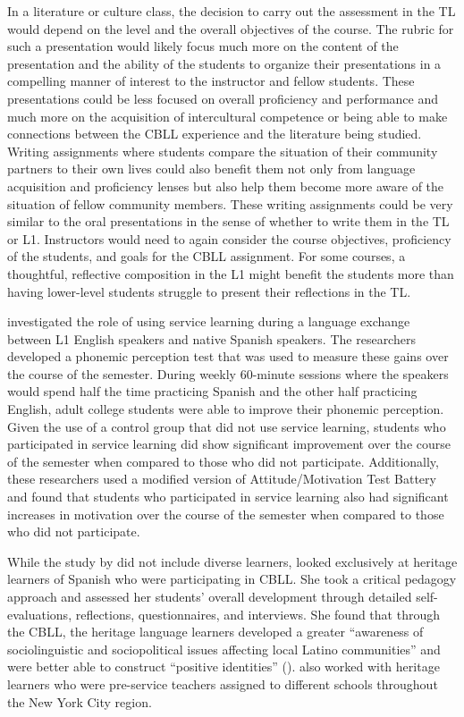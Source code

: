 \documentclass[output=paper]{langscibook}
\begin{document}
In a literature or culture class, the decision to carry out the assessment in the TL would depend on the level and the overall objectives of the course. The rubric for such a presentation would likely focus much more on the content of the presentation and the ability of the students to organize their presentations in a compelling manner of interest to the instructor and fellow students. These presentations could be less focused on overall proficiency and performance and much more on the acquisition of intercultural competence or being able to make connections between the CBLL experience and the literature being studied. Writing assignments where students compare the situation of their community partners to their own lives could also benefit them not only from language acquisition and proficiency lenses but also help them become more aware of the situation of fellow community members. These writing assignments could be very similar to the oral presentations in the sense of whether to write them in the TL or L1. Instructors would need to again consider the course objectives, proficiency of the students, and goals for the CBLL assignment. For some courses, a thoughtful, reflective composition in the L1 might benefit the students more than having lower-level students struggle to present their reflections in the TL.\largerpage[-1]

\citet{MedinaGordon2014} investigated the role of using service learning during a language exchange between L1 English speakers and native Spanish speakers. The researchers developed a phonemic perception test that was used to measure these gains over the course of the semester. During weekly 60-minute sessions where the speakers would spend half the time practicing Spanish and the other half practicing English, adult college students were able to improve their phonemic perception. Given the use of a control group that did not use service learning, students who participated in service learning did show significant improvement over the course of the semester when compared to those who did not participate. Additionally, these researchers used a modified version of  Attitude/Motivation Test Battery and found that students who participated in service learning also had significant increases in motivation over the course of the semester when compared to those who did not participate.

While the study by \citet{MedinaGordon2014} did not include diverse learners, \citet{LowtherPereira2015} looked exclusively at heritage learners of Spanish who were participating in CBLL. She took a critical pedagogy approach and assessed her students’ overall development through detailed self-evaluations, reflections, questionnaires, and interviews. She found that through the CBLL, the heritage language learners developed a greater “awareness of sociolinguistic and sociopolitical issues affecting local Latino communities” and were better able to construct “positive identities” (\citeyear[159]{LowtherPereira2015}). \citet{Salgado-RoblesLamboy2019} also worked with heritage learners who were pre-service teachers assigned to different schools throughout the New York City region.
\end{document}
